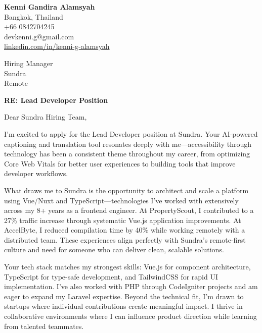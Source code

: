 \documentclass[11pt]{article}
\begin{document}
\begin{flushleft}
\textbf{Kenni Gandira Alamsyah}\\
Bangkok, Thailand\\
+66 0842704245\\
devkenni.g@gmail.com\\
\href{https://www.linkedin.com/in/kenni-g-alamsyah/}{linkedin.com/in/kenni-g-alamsyah}
\end{flushleft}

\vspace{1em}

\begin{flushleft}
Hiring Manager\\
Sundra\\
Remote
\end{flushleft}

\vspace{1em}

\textbf{RE: Lead Developer Position}

\vspace{1em}

Dear Sundra Hiring Team,

I'm excited to apply for the Lead Developer position at Sundra. Your AI-powered captioning and translation tool resonates deeply with me—accessibility through technology has been a consistent theme throughout my career, from optimizing Core Web Vitals for better user experiences to building tools that improve developer workflows.

What draws me to Sundra is the opportunity to architect and scale a platform using Vue/Nuxt and TypeScript—technologies I've worked with extensively across my 8+ years as a frontend engineer. At PropertyScout, I contributed to a 27\% traffic increase through systematic Vue.js application improvements. At AccelByte, I reduced compilation time by 40\% while working remotely with a distributed team. These experiences align perfectly with Sundra's remote-first culture and need for someone who can deliver clean, scalable solutions.

Your tech stack matches my strongest skills: Vue.js for component architecture, TypeScript for type-safe development, and TailwindCSS for rapid UI implementation. I've also worked with PHP through CodeIgniter projects and am eager to expand my Laravel expertise. Beyond the technical fit, I'm drawn to startups where individual contributions create meaningful impact. I thrive in collaborative environments where I can influence product direction while learning from talented teammates.
\end{document}
